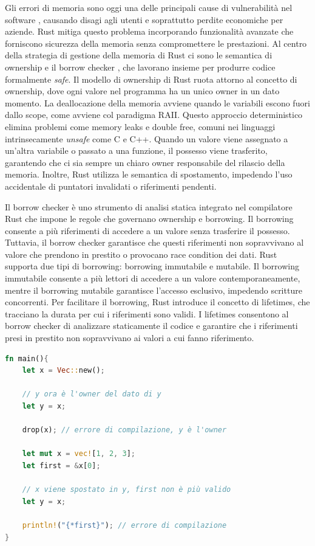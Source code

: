 Gli errori di memoria sono oggi una delle principali cause di vulnerabilità nel software \cite[]{Mic:memory_safety}, causando disagi agli utenti e soprattutto perdite economiche per aziende. Rust mitiga questo problema incorporando funzionalità avanzate che forniscono sicurezza della memoria senza compromettere le prestazioni. Al centro della strategia di gestione della memoria di Rust ci sono le semantica di ownership e il borrow checker \cite[]{Rust:borrow_checker}, che lavorano insieme per produrre codice formalmente \textit{safe}. Il modello di ownership di Rust ruota attorno al concetto di ownership, dove ogni valore nel programma ha un unico owner in un dato momento. La deallocazione della memoria avviene quando le variabili escono fuori dallo scope, come avviene col paradigma RAII. Questo approccio deterministico elimina problemi come memory leaks e double free, comuni nei linguaggi intrinsecamente \textit{unsafe} come C e C++. Quando un valore viene assegnato a un'altra variabile o passato a una funzione, il possesso viene trasferito, garantendo che ci sia sempre un chiaro owner responsabile del rilascio della memoria. Inoltre, Rust utilizza le semantica di spostamento, impedendo l'uso accidentale di puntatori invalidati o riferimenti pendenti.

Il borrow checker è uno strumento di analisi statica integrato nel compilatore Rust che impone le regole che governano ownership e borrowing. Il borrowing consente a più riferimenti di accedere a un valore senza trasferire il possesso. Tuttavia, il borrow checker garantisce che questi riferimenti non sopravvivano al valore che prendono in prestito o provocano race condition dei dati. Rust supporta due tipi di borrowing: borrowing immutabile e mutabile. Il borrowing immutabile consente a più lettori di accedere a un valore contemporaneamente, mentre il borrowing mutabile garantisce l'accesso esclusivo, impedendo scritture concorrenti. Per facilitare il borrowing, Rust introduce il concetto di lifetimes, che tracciano la durata per cui i riferimenti sono validi. I lifetimes consentono al borrow checker di analizzare staticamente il codice e garantire che i riferimenti presi in prestito non sopravvivano ai valori a cui fanno riferimento.

\vspace{5mm}
\begin{lstlisting}[language=Rust, caption=Controllo dei puntatori in fase di compilazione, label=lis:rust_borrow_checker]
fn main(){
    let x = Vec::new();

    // y ora è l'owner del dato di y
    let y = x;

    drop(x); // errore di compilazione, y è l'owner

    let mut x = vec![1, 2, 3];
    let first = &x[0];

    // x viene spostato in y, first non è più valido
    let y = x;
    
    println!("{*first}"); // errore di compilazione
}
\end{lstlisting}
\vspace{5mm}

